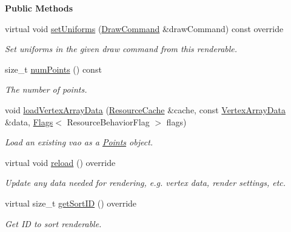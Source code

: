\begin{Indent}\textbf{ Public Methods}\par
\begin{DoxyCompactItemize}
\item 
virtual void \mbox{\hyperlink{classrev_1_1_points_a598b47126cab4485664cb83f07ba2651}{set\+Uniforms}} (\mbox{\hyperlink{classrev_1_1_draw_command}{Draw\+Command}} \&draw\+Command) const override
\begin{DoxyCompactList}\small\item\em Set uniforms in the given draw command from this renderable. \end{DoxyCompactList}\item 
\mbox{\label{classrev_1_1_points_a4512153760c1a4f2d5b8b7dcaddec6de}} 
size\+\_\+t \mbox{\hyperlink{classrev_1_1_points_a4512153760c1a4f2d5b8b7dcaddec6de}{num\+Points}} () const
\begin{DoxyCompactList}\small\item\em The number of points. \end{DoxyCompactList}\item 
\mbox{\label{classrev_1_1_points_a3eee4f7acc81c6fe9ee17230945d2f60}} 
void \mbox{\hyperlink{classrev_1_1_points_a3eee4f7acc81c6fe9ee17230945d2f60}{load\+Vertex\+Array\+Data}} (\mbox{\hyperlink{classrev_1_1_resource_cache}{Resource\+Cache}} \&cache, const \mbox{\hyperlink{classrev_1_1_vertex_array_data}{Vertex\+Array\+Data}} \&data, \mbox{\hyperlink{classrev_1_1_flags}{Flags}}$<$ Resource\+Behavior\+Flag $>$ flags)
\begin{DoxyCompactList}\small\item\em Load an existing vao as a \mbox{\hyperlink{classrev_1_1_points}{Points}} object. \end{DoxyCompactList}\item 
\mbox{\label{classrev_1_1_points_a9053da710d5444f2f8b467ffc1c4ecfd}} 
virtual void \mbox{\hyperlink{classrev_1_1_points_a9053da710d5444f2f8b467ffc1c4ecfd}{reload}} () override
\begin{DoxyCompactList}\small\item\em Update any data needed for rendering, e.\+g. vertex data, render settings, etc. \end{DoxyCompactList}\item 
\mbox{\label{classrev_1_1_points_a3fc3d3cb063d8570058c7a47824ac1bb}} 
virtual size\+\_\+t \mbox{\hyperlink{classrev_1_1_points_a3fc3d3cb063d8570058c7a47824ac1bb}{get\+Sort\+ID}} () override
\begin{DoxyCompactList}\small\item\em Get ID to sort renderable. \end{DoxyCompactList}\end{DoxyCompactItemize}
\end{Indent}
